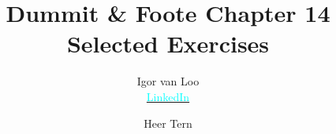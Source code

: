 \renewenvironment{solution}%
{\noindent\textit{Solution. }}{\hfill$\square$\vspace{0.7cm}}

\newtheorem{dummy}{Dummy} %
\newtheorem{dummy2}{Dummy2}
\newtheorem{dummy3}{Dummy3}

\theoremstyle{definition}
\newtheorem{definition}[dummy]{Definition}
\newtheorem{example}[dummy]{Example}
\newtheorem{note}[dummy]{Note}
\newtheorem{axiom}[dummy]{Axiom}
\newtheorem{remark}[dummy]{Remark}
\newtheorem{fact}[dummy]{Fact}
\newtheorem{result}[dummy]{Result}
\newtheorem{algo}[dummy]{Algorithm}

\theoremstyle{plain}
\newtheorem{theorem}[dummy]{Theorem}
\newtheorem{proposition}[dummy]{Proposition}
\newtheorem{corollary}[dummy]{Corollary}

\title{Dummit \& Foote Chapter 14 Selected Exercises}
\author{
    Igor van Loo\\ \href{https://www.linkedin.com/in/igorvanloo/}{\textcolor{cyan}{LinkedIn}} 
    \and
    Heer Tern}